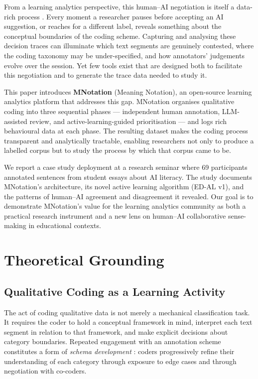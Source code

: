 \documentclass[fleqn,10pt]{JLA_article}
\begin{document}
From a learning analytics perspective, this human--AI negotiation is itself a
data-rich process \cite{gasevic2015lets}. Every moment a researcher pauses before
accepting an AI suggestion, or reaches for a different label, reveals something about
the conceptual boundaries of the coding scheme. Capturing and analysing these decision
traces can illuminate which text segments are genuinely contested, where the coding
taxonomy may be under-specified, and how annotators' judgements evolve over the session.
Yet few tools exist that are designed both to facilitate this negotiation and to generate
the trace data needed to study it.

This paper introduces \textbf{MNotation} (Meaning Notation), an open-source learning
analytics platform that addresses this gap. MNotation organises qualitative coding into
three sequential phases — independent human annotation, LLM-assisted review, and
active-learning-guided prioritisation — and logs rich behavioural data at each phase.
The resulting dataset makes the coding process transparent and analytically tractable,
enabling researchers not only to produce a labelled corpus but to study the process by
which that corpus came to be.

We report a case study deployment at a research seminar where 69 participants annotated
sentences from student essays about AI literacy. The study documents MNotation's
architecture, its novel active learning algorithm (ED-AL v1), and the patterns of
human--AI agreement and disagreement it revealed. Our goal is to demonstrate MNotation's
value for the learning analytics community as both a practical research instrument and a
new lens on human--AI collaborative sense-making in educational contexts.

\section{Theoretical Grounding}

\subsection{Qualitative Coding as a Learning Activity}

The act of coding qualitative data is not merely a mechanical classification task.
It requires the coder to hold a conceptual framework in mind, interpret each text
segment in relation to that framework, and make explicit decisions about category
boundaries. Repeated engagement with an annotation scheme constitutes a form of
\emph{schema development} \cite{chi2021translating}: coders progressively refine
their understanding of each category through exposure to edge cases and through
negotiation with co-coders.
\end{document}
